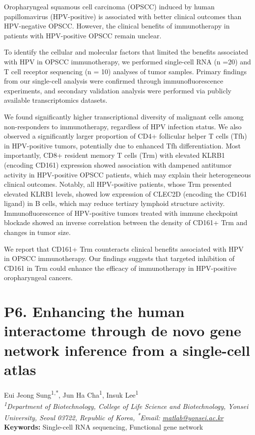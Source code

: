 \noindent
Oropharyngeal squamous cell carcinoma (OPSCC) induced by human papillomavirus (HPV-positive) is associated with better clinical outcomes than HPV-negative OPSCC. However, the clinical benefits of immunotherapy in patients with HPV-positive OPSCC remain unclear. 

To identify the cellular and molecular factors that limited the benefits associated with HPV in OPSCC immunotherapy, we performed single-cell RNA (n =20) and T cell receptor sequencing (n = 10) analyses of tumor samples. Primary findings from our single-cell analysis were confirmed through immunofluorescence experiments, and secondary validation analysis were performed via publicly available transcriptomics datasets. 

We found significantly higher transcriptional diversity of malignant cells among non-responders to immunotherapy, regardless of HPV infection status. We also observed a significantly larger proportion of CD4+ follicular helper T cells (Tfh) in HPV-positive tumors, potentially due to enhanced Tfh differentiation. Most importantly, CD8+ resident memory T cells (Trm) with elevated KLRB1 (encoding CD161) expression showed association with dampened antitumor activity in HPV-positive OPSCC patients, which may explain their heterogeneous clinical outcomes. Notably, all HPV-positive patients, whose Trm presented elevated KLRB1 levels, showed low expression of CLEC2D (encoding the CD161 ligand) in B cells, which may reduce tertiary lymphoid structure activity. Immunofluorescence of HPV-positive tumors treated with immune checkpoint blockade showed an inverse correlation between the density of CD161+ Trm and changes in tumor size. 

We report that CD161+ Trm counteracts clinical benefits associated with HPV in OPSCC immunotherapy. Our findings suggests that targeted inhibition of CD161 in Trm could enhance the efficacy of immunotherapy in HPV-positive oropharyngeal cancers.
\newpage


\section*{P6. Enhancing the human interactome through de novo gene network inference from a single-cell atlas}

\begin{center}
Eui Jeong Sung\textsuperscript{1,*}, Jun Ha Cha\textsuperscript{1}, Insuk Lee\textsuperscript{1} \\
\vspace{0.2cm}
\textit{\textsuperscript{1}Department of Biotechnology, College of Life Science and Biotechnology, Yonsei University, Seoul 03722, Republic of Korea, \textsuperscript{*}Email: \href{mailto:matlab@yonsei.ac.kr}{matlab@yonsei.ac.kr}} \\
\vspace{0.2cm}
\textbf{Keywords:} Single-cell RNA sequencing, Functional gene network
\end{center}

